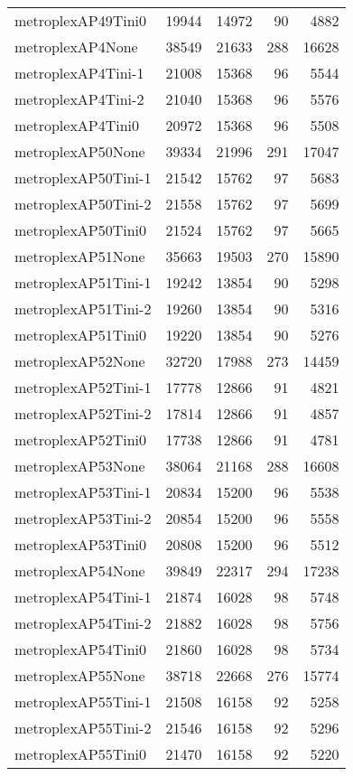 \begin{longtable}{lrrrr}
metroplexAP49Tini0 & 19944 & 14972 & 90 & 4882 \\
metroplexAP4None & 38549 & 21633 & 288 & 16628 \\
metroplexAP4Tini-1 & 21008 & 15368 & 96 & 5544 \\
metroplexAP4Tini-2 & 21040 & 15368 & 96 & 5576 \\
metroplexAP4Tini0 & 20972 & 15368 & 96 & 5508 \\
metroplexAP50None & 39334 & 21996 & 291 & 17047 \\
metroplexAP50Tini-1 & 21542 & 15762 & 97 & 5683 \\
metroplexAP50Tini-2 & 21558 & 15762 & 97 & 5699 \\
metroplexAP50Tini0 & 21524 & 15762 & 97 & 5665 \\
metroplexAP51None & 35663 & 19503 & 270 & 15890 \\
metroplexAP51Tini-1 & 19242 & 13854 & 90 & 5298 \\
metroplexAP51Tini-2 & 19260 & 13854 & 90 & 5316 \\
metroplexAP51Tini0 & 19220 & 13854 & 90 & 5276 \\
metroplexAP52None & 32720 & 17988 & 273 & 14459 \\
metroplexAP52Tini-1 & 17778 & 12866 & 91 & 4821 \\
metroplexAP52Tini-2 & 17814 & 12866 & 91 & 4857 \\
metroplexAP52Tini0 & 17738 & 12866 & 91 & 4781 \\
metroplexAP53None & 38064 & 21168 & 288 & 16608 \\
metroplexAP53Tini-1 & 20834 & 15200 & 96 & 5538 \\
metroplexAP53Tini-2 & 20854 & 15200 & 96 & 5558 \\
metroplexAP53Tini0 & 20808 & 15200 & 96 & 5512 \\
metroplexAP54None & 39849 & 22317 & 294 & 17238 \\
metroplexAP54Tini-1 & 21874 & 16028 & 98 & 5748 \\
metroplexAP54Tini-2 & 21882 & 16028 & 98 & 5756 \\
metroplexAP54Tini0 & 21860 & 16028 & 98 & 5734 \\
metroplexAP55None & 38718 & 22668 & 276 & 15774 \\
metroplexAP55Tini-1 & 21508 & 16158 & 92 & 5258 \\
metroplexAP55Tini-2 & 21546 & 16158 & 92 & 5296 \\
metroplexAP55Tini0 & 21470 & 16158 & 92 & 5220 \\

\end{longtable}
